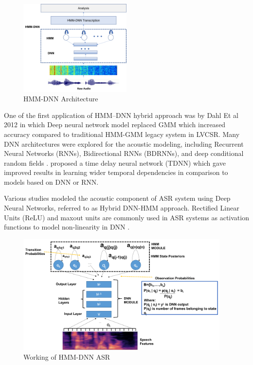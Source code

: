 \begin{figure}[h]
    \centering
    \includegraphics[width=0.5\textwidth]{img/HMM-DNN.png}
    \caption{HMM-DNN Architecture}
    \label{fig:Hmm-dnn-arch}
\end{figure}

One of the first application of HMM–DNN hybrid approach was by Dahl Et al 2012 \cite{dahl_context-dependent_2012} in which Deep neural network model replaced GMM which increased accuracy compared to traditional HMM-GMM legacy system in LVCSR. Many DNN architectures were explored for the acoustic modeling, including Recurrent Neural Networks (RNNs), Bidirectional RNNs (BDRNNs), and deep conditional random fields \cite{graves_speech_2013, hifny_unified_2015}. \cite{vijayaditya_time_2015} proposed a time delay neural network (TDNN) which gave improved results in learning wider temporal dependencies in comparison to models based on DNN or RNN. 

Various studies \cite{smit_advances_2021, li_hybrid_2013, ochiai_speaker_2016} modeled the acoustic component of ASR system using Deep Neural Networks, referred to as Hybrid DNN-HMM approach. Rectified Linear Units (ReLU) and maxout units are commonly used in ASR systems as activation functions to model non-linearity in DNN \cite{backstrom_introduction_2022}. 

\begin{figure}[h]
    \centering
    \includegraphics[width=0.95\textwidth]{img/generic-Hmm-DNN.png}
    \caption{Working of HMM-DNN ASR}
    \label{fig:working-hmm-dnn}
\end{figure}

